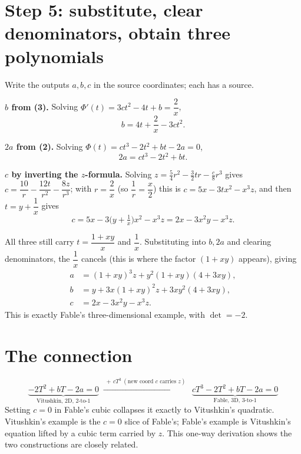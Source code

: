 \documentclass[11pt]{article}
\theoremstyle{plain}
\theoremstyle{definition}
\begin{document}
\section*{Step 5: substitute, clear denominators, obtain three polynomials}
Write the outputs $a,b,c$ in the source coordinates; each has a source.

\medskip\noindent\textbf{$b$ from (3).} Solving
$\Phi'(t)=3ct^2-4t+b=\dfrac2x$,
\[
  b = 4t+\frac2x-3ct^2 .
\]

\noindent\textbf{$2a$ from (2).} Solving $\Phi(t)=ct^3-2t^2+bt-2a=0$,
\[
  2a = ct^3-2t^2+bt .
\]

\noindent\textbf{$c$ by inverting the $z$-formula.} Solving
$z=\frac54r^2-\frac32tr-\frac c8r^3$ gives
$c=\dfrac{10}{r}-\dfrac{12t}{r^2}-\dfrac{8z}{r^3}$; with $r=\dfrac2x$ (so
$\dfrac1r=\dfrac x2$) this is $c=5x-3tx^2-x^3z$, and then $t=y+\dfrac1x$ gives
\[
  c = 5x-3\Big(y+\tfrac1x\Big)x^2-x^3z = 2x-3x^2y-x^3z .
\]

All three still carry $t=\dfrac{1+xy}{x}$ and $\dfrac1x$. Substituting into
$b,2a$ and clearing denominators, the $\dfrac1x$ cancels (this is where the
factor $(1+xy)$ appears), giving
\[
\begin{aligned}
  a &= (1+xy)^3z+y^2(1+xy)(4+3xy),\\
  b &= y+3x(1+xy)^2z+3xy^2(4+3xy),\\
  c &= 2x-3x^2y-x^3z .
\end{aligned}
\]
This is exactly Fable's three-dimensional example, with $\det=-2$.

\section*{The connection}
\[
  \underbrace{-2T^2+bT-2a=0}_{\text{Vitushkin, 2D, }2\text{-to-}1}
  \;\xrightarrow{\;+\,cT^3\ (\text{new coord }c\text{ carries }z)\;}\;
  \underbrace{cT^3-2T^2+bT-2a=0}_{\text{Fable, 3D, }3\text{-to-}1}
\]
Setting $c=0$ in Fable's cubic collapses it exactly to Vitushkin's
quadratic. Vitushkin's example is the $c=0$ slice of Fable's; Fable's example
is Vitushkin's equation lifted by a cubic term carried by $z$. This
one-way derivation shows the two constructions are closely related.

\end{document}
